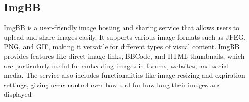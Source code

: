 \subsection{ImgBB}

ImgBB is a user-friendly image hosting and sharing service that allows users to upload and share images easily. It supports various image formats such as JPEG, PNG, and GIF, making it versatile for different types of visual content. ImgBB provides features like direct image links, BBCode, and HTML thumbnails, which are particularly useful for embedding images in forums, websites, and social media. The service also includes functionalities like image resizing and expiration settings, giving users control over how and for how long their images are displayed.
